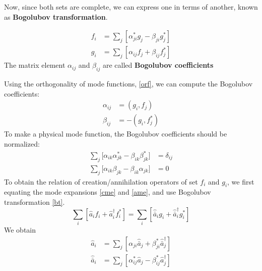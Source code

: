 \documentclass[12pt]{article}
\numberwithin{equation}{subsection}
\theoremstyle{mystyle}{\newtheorem{definition}{Definition}[subsection]}
\theoremstyle{mystyle}{\newtheorem{theorem}[definition]{Theorem}}
\theoremstyle{mystyle}{\newtheorem*{remark}{Remark}}
\theoremstyle{mystyle}{\newtheorem{example}{Example}[subsection]}
\theoremstyle{mystyle}{\newtheorem{examples}{Examples}[subsection]}
\theoremstyle{mystyle}{\newtheorem{cthm}{}[subsection]}
\newcommand{\tbf}[1]{\textbf{#1}}
\begin{document}
Now, since both sets are complete, we can express one in terms of another, known as \tbf{Bogolubov transformation}.
\begin{definition}\label{bt}
  \begin{align*}
    f_i & =\sum_j\left[\alpha^*_{ji}g_j-\beta_{ji}g^*_j\right] \\
    g_i & =\sum_j\left[\alpha_{ij}f_j+\beta_{ij}f_j^*\right]
  \end{align*}
  The matrix element \(\alpha_{ij}\) and \(\beta_{ij}\) are called \tbf{Bogolubov coefficients}
\end{definition}
Using the orthogonality of mode functions, \ref{orf}, we can compute the Bogolubov coefficients:
\begin{align}
  \alpha_{ij}&=(g_i,f_j)\\
\beta_{ij}&= -(g_i,f_j^*)
\end{align}
To make a physical mode function, the Bogolubov coefficients should be normalized:
\begin{align}
  \sum_j\bigl[\alpha_{ik}\alpha^*_{jk}-\beta_{ik}\beta^*_{jk}\bigr]&=\delta_{ij}\\
  \sum_j\bigl[\alpha_{ik}\beta_{jk}-\beta_{ik}\alpha_{jk}\bigr]&=0
\end{align}
To obtain the relation of creation/annihilation operators of set \(f_i\) and \(g_i\), 
we first equating the mode expansions \ref{cme} and \ref{ame}, and use Bogolubov transformation \ref{bt}.
\begin{equation}
  \sum_i\left[\hat{a}_i f_i+\hat{a}_i^\dagger f_i^*\right]=\sum_i\left[\hat{\bar{a}}_i g_i+\hat{\bar{a}}_i^\dagger g_i^*\right]
\end{equation}
We obtain 
\begin{align}
  \hat{a}_i &=\sum_j\left[\alpha_{ji}\hat{\bar{a}}_j+\beta^*_{ji}\hat{\bar{a}}^{\dagger}_j\right]\\
  \hat{\bar{a}}_i &=\sum_j\left[\alpha^*_{ij}\hat{a}_j-\beta^*_{ij}\hat{a}^{\dagger}_j\right]
\end{align}
\end{document}
